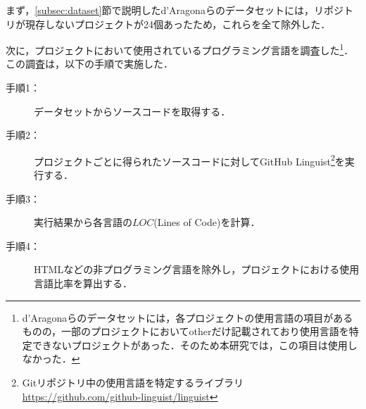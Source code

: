 \documentclass[T,J]{fose}
\begin{document}
まず，\ref{subsec:dataset}節で説明したd'Aragonaらのデータセットには，リポジトリが現存しないプロジェクトが24個あったため，これらを全て除外した．


次に，プロジェクトにおいて使用されているプログラミング言語を調査した\footnote{d'Aragonaらのデータセットには，各プロジェクトの使用言語の項目があるものの，一部のプロジェクトにおいて{\sf other}だけ記載されており使用言語を特定できないプロジェクトがあった．そのため本研究では，この項目は使用しなかった．}．
この調査は，以下の手順で実施した．
\begin{description}
    \item[手順1：] データセットからソースコードを取得する．
    \item[手順2：] プロジェクトごとに得られたソースコードに対してGitHub Linguist\footnote{Gitリポジトリ中の使用言語を特定するライブラリ \url{https://github.com/github-linguist/linguist}}を実行する．
    \item[手順3：] 実行結果から各言語の$LOC$(Lines of Code)を計算．
    \item[手順4：] HTMLなどの非プログラミング言語を除外し，プロジェクトにおける使用言語比率を算出する．
\end{description}
\end{document}
